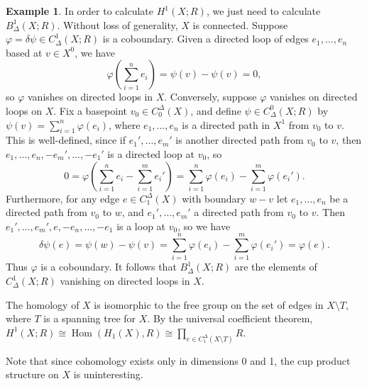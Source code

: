 \documentclass{book}
\renewcommand{\phi}{\varphi}
\newcommand{\parens}[1]{\left( {#1} \right)}
\DeclareMathOperator{\Hom}{Hom}
\theoremstyle{definition}
\newtheorem{example}[theorem]{Example}
\theoremstyle{remark}
\numberwithin{equation}{section}
\begin{document}
\begin{example}
    In order to calculate $H^1(X;R)$, we just need to calculate $B^1_\Delta(X;R)$. Without loss of generality, $X$ is connected. Suppose $\phi = \delta\psi \in C^1_\Delta(X;R)$ is a coboundary. Given a directed loop of edges $e_1,\dots,e_n$ based at $v \in X^0$, we have 
    \begin{equation}
        \phi\parens{ \sum_{i=1}^n e_i } = \psi(v) - \psi(v) = 0,
    \end{equation}
    so $\phi$ vanishes on directed loops in $X$. Conversely, suppose $\phi$ vanishes on directed loops on $X$. Fix a basepoint $v_0 \in C_0^\Delta(X)$, and define $\psi \in C^0_\Delta(X;R)$ by $\psi(v) = \sum_{i=1}^n \phi(e_i)$, where $e_1,\dots,e_n$ is a directed path in $X^1$ from $v_0$ to $v$. This is well-defined, since if $e_1',\dots,e_m'$ is another directed path from $v_0$ to $v$, then $e_1,\dots,e_n,-e_m',\dots,-e_1'$ is a directed loop at $v_0$, so 
    \begin{equation}
        0 = \phi(\sum_{i=1}^n e_i - \sum_{i=1}^m e_i') = \sum_{i=1}^n \phi(e_i) - \sum_{i=1}^m \phi(e_i').
    \end{equation}
    Furthermore, for any edge $e \in C_1^\Delta(X)$ with boundary $w - v$ let $e_1,\dots,e_n$ be a directed path from $v_0$ to $w$, and $e_1',\dots,e_m'$ a directed path from $v_0$ to $v$. Then $e_1',\dots,e_m',e,-e_n,\dots,-e_1$ is a loop at $v_0$, so we have 
    \begin{equation}
        \delta\psi(e) = \psi(w) - \psi(v) = \sum_{i=1}^n \phi(e_i) - \sum_{i=1}^m \phi(e_i') = \phi(e).
    \end{equation}
    Thus $\phi$ is a coboundary. It follows that $B^1_\Delta(X;R)$ are the elements of $C^1_\Delta(X;R)$ vanishing on directed loops in $X$.

    The homology of $X$ is isomorphic to the free group on the set of edges in $X \setminus T$, where $T$ is a spanning tree for $X$. By the universal coefficient theorem, $H^1(X;R) \cong \Hom(H_1(X),R) \cong \prod_{e \in C_1^\Delta(X \setminus T)} R$.

    Note that since cohomology exists only in dimensions 0 and 1, the cup product structure on $X$ is uninteresting.
\end{example}
\end{document}
